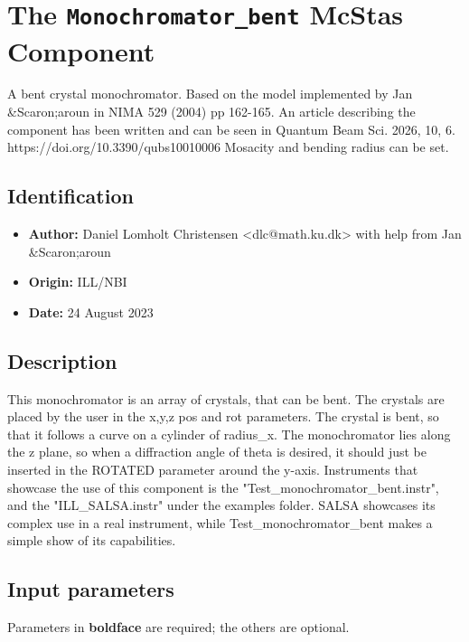 \section{The \texttt{Monochromator\_bent} McStas Component}
A bent crystal monochromator. Based on the model implemented by Jan \&Scaron;aroun in NIMA 529 (2004) pp 162-165.
An article describing the component has been written and can be seen in Quantum Beam Sci. 2026, 10, 6. https://doi.org/10.3390/qubs10010006
Mosacity and bending radius can be set.

\subsection*{Identification}
\begin{itemize}
  \item \textbf{Author:} Daniel Lomholt Christensen \textless{}dlc@math.ku.dk\textgreater{} with help from Jan \&Scaron;aroun
  \item \textbf{Origin:} ILL/NBI
  \item \textbf{Date:} 24 August 2023
\end{itemize}

\subsection*{Description}
This monochromator is an array of crystals, that can be bent. The crystals are placed by the user in the x,y,z pos and rot parameters. The crystal is bent, so that it follows a curve on a cylinder of radius\_x. The monochromator lies along the z plane, so when a diffraction angle of theta is desired, it should just be inserted in the ROTATED parameter around the y-axis. Instruments that showcase the use of this component is the "Test\_monochromator\_bent.instr", and the "ILL\_SALSA.instr" under the examples folder. SALSA showcases its complex use in a real instrument, while Test\_monochromator\_bent makes a simple show of its capabilities.

\subsection*{Input parameters}
Parameters in \textbf{boldface} are required; the others are optional.

